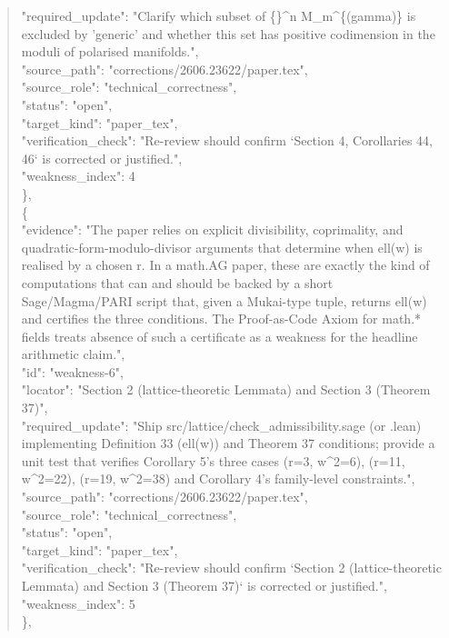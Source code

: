 \documentclass[11pt]{article}
\begin{document}
\begin{quote}
      "required\_update": "Clarify which subset of \{\}\^{}n M\_m\^{}\{(gamma)\} is excluded by 'generic' and whether this set has positive codimension in the moduli of polarised manifolds.",\\
      "source\_path": "corrections/2606.23622/paper.tex",\\
      "source\_role": "technical\_correctness",\\
      "status": "open",\\
      "target\_kind": "paper\_tex",\\
      "verification\_check": "Re-review should confirm `Section 4, Corollaries 44, 46` is corrected or justified.",\\
      "weakness\_index": 4\\
    \},\\
    \{\\
      "evidence": "The paper relies on explicit divisibility, coprimality, and quadratic-form-modulo-divisor arguments that determine when ell(w) is realised by a chosen r. In a math.AG paper, these are exactly the kind of computations that can and should be backed by a short Sage/Magma/PARI script that, given a Mukai-type tuple, returns ell(w) and certifies the three conditions. The Proof-as-Code Axiom for math.* fields treats absence of such a certificate as a weakness for the headline arithmetic claim.",\\
      "id": "weakness-6",\\
      "locator": "Section 2 (lattice-theoretic Lemmata) and Section 3 (Theorem 37)",\\
      "required\_update": "Ship src/lattice/check\_admissibility.sage (or .lean) implementing Definition 33 (ell(w)) and Theorem 37 conditions; provide a unit test that verifies Corollary 5's three cases (r=3, w\^{}2=6), (r=11, w\^{}2=22), (r=19, w\^{}2=38) and Corollary 4's family-level constraints.",\\
      "source\_path": "corrections/2606.23622/paper.tex",\\
      "source\_role": "technical\_correctness",\\
      "status": "open",\\
      "target\_kind": "paper\_tex",\\
      "verification\_check": "Re-review should confirm `Section 2 (lattice-theoretic Lemmata) and Section 3 (Theorem 37)` is corrected or justified.",\\
      "weakness\_index": 5\\
    \},\\

\end{quote}
\end{document}
